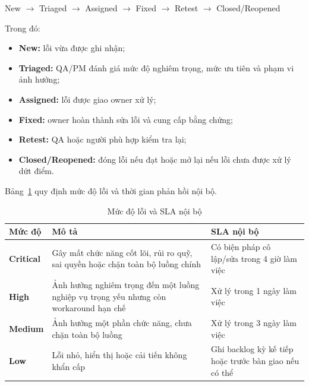 \begin{center}
New $\rightarrow$ Triaged $\rightarrow$ Assigned $\rightarrow$ Fixed $\rightarrow$ Retest $\rightarrow$ Closed/Reopened
\end{center}

Trong đó:

\begin{itemize}
  \item \textbf{New:} lỗi vừa được ghi nhận;
  \item \textbf{Triaged:} QA/PM đánh giá mức độ nghiêm trọng, mức ưu tiên và phạm vi ảnh hưởng;
  \item \textbf{Assigned:} lỗi được giao owner xử lý;
  \item \textbf{Fixed:} owner hoàn thành sửa lỗi và cung cấp bằng chứng;
  \item \textbf{Retest:} QA hoặc người phù hợp kiểm tra lại;
  \item \textbf{Closed/Reopened:} đóng lỗi nếu đạt hoặc mở lại nếu lỗi chưa được xử lý dứt điểm.
\end{itemize}

Bảng~\ref{tab:defect-severity} quy định mức độ lỗi và thời gian phản hồi nội bộ.

\begin{table}[H]
\centering
\caption{Mức độ lỗi và SLA nội bộ}
\label{tab:defect-severity}
\begin{tabularx}{\textwidth}{| >{\bfseries}p{2.2cm} | p{6cm} | X |}
\hline
Mức độ & Mô tả & SLA nội bộ \\
\hline
Critical & Gây mất chức năng cốt lõi, rủi ro quỹ, sai quyền hoặc chặn toàn bộ luồng chính & Có biện pháp cô lập/sửa trong 4 giờ làm việc \\ \hline
High & Ảnh hưởng nghiêm trọng đến một luồng nghiệp vụ trọng yếu nhưng còn workaround hạn chế & Xử lý trong 1 ngày làm việc \\ \hline
Medium & Ảnh hưởng một phần chức năng, chưa chặn toàn bộ luồng & Xử lý trong 3 ngày làm việc \\ \hline
Low & Lỗi nhỏ, hiển thị hoặc cải tiến không khẩn cấp & Ghi backlog kỳ kế tiếp hoặc trước bàn giao nếu có thể \\
\hline
\end{tabularx}
\end{table}


